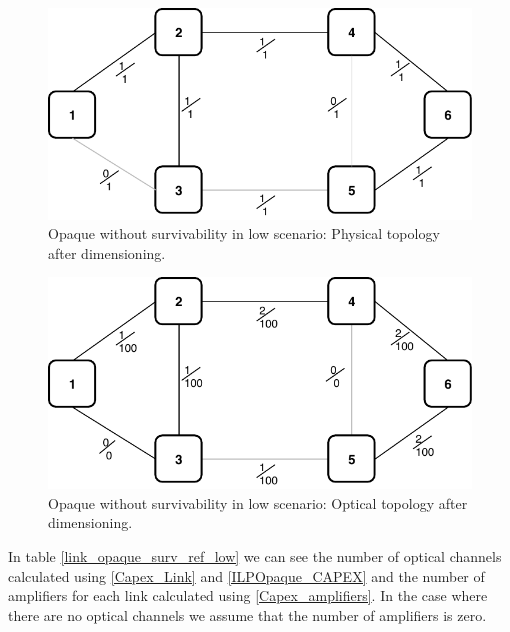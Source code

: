 \begin{figure}[h!]
\centering
\includegraphics[width=12cm]{sdf/ilp/opaque_survivability/figures/physical_topology_low}
\caption{Opaque without survivability in low scenario: Physical topology after dimensioning.}
\label{physical_low}
\end{figure}
\newpage
\begin{figure}[h!]
\centering
\includegraphics[width=12cm]{sdf/ilp/opaque_survivability/figures/optical_topology_low}
\caption{Opaque without survivability in low scenario: Optical topology after dimensioning.}
\label{optical_low}
\end{figure}

In table \ref{link_opaque_surv_ref_low} we can see the number of optical channels calculated using \ref{Capex_Link} and \ref{ILPOpaque_CAPEX} and the number of amplifiers for each link calculated using \ref{Capex_amplifiers}. In the case where there are no optical channels we assume that the number of amplifiers is zero.

